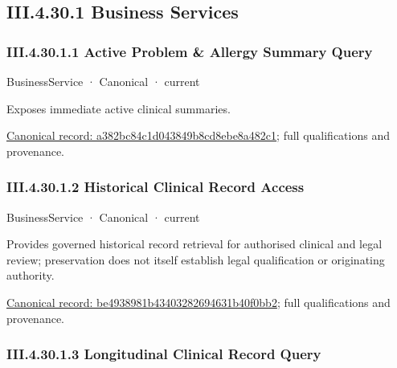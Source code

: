 \subsection*{III.4.30.1 Business Services}
\label{navigation:III.4.30.1}

\subsubsection*{III.4.30.1.1 Active Problem \& Allergy Summary Query}
\label{navigation:III.4.30.1.1}

\label{element:a382bc84c1d043849b8cd8ebe8a482c1}
{\small BusinessService · Canonical · current}\par

Exposes immediate active clinical summaries.


{\footnotesize \href{../../../../continuum/business/business-service/a382bc84c1d043849b8cd8ebe8a482c1.md}{Canonical record: a382bc84c1d043849b8cd8ebe8a482c1}; full qualifications and provenance.}\par
\subsubsection*{III.4.30.1.2 Historical Clinical Record Access}
\label{navigation:III.4.30.1.2}

\label{element:be4938981b43403282694631b40f0bb2}
{\small BusinessService · Canonical · current}\par

Provides governed historical record retrieval for authorised clinical and legal review; preservation does not itself establish legal qualification or originating authority.


{\footnotesize \href{../../../../continuum/business/business-service/be4938981b43403282694631b40f0bb2.md}{Canonical record: be4938981b43403282694631b40f0bb2}; full qualifications and provenance.}\par
\subsubsection*{III.4.30.1.3 Longitudinal Clinical Record Query}
\label{navigation:III.4.30.1.3}

